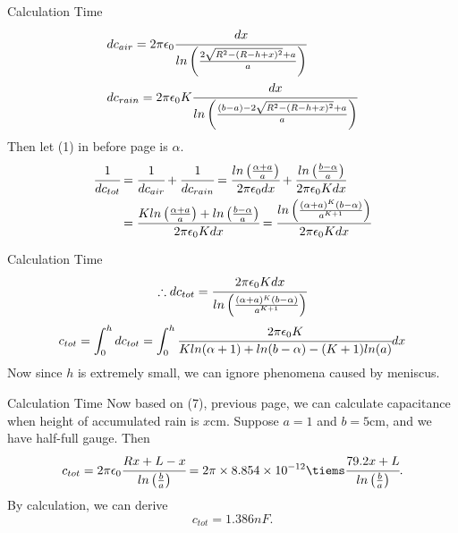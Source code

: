 \documentclass{beamer}
\begin{document}
\begin{frame}{Calculation Time}
    \begin{align}
        &dc_{air}=2\pi\epsilon_0\cfrac{dx}{ln\left(\frac{2\sqrt{R^2-(R-h+x)^2}+a}{a}\right)} \\
        &dc_{rain}=2\pi\epsilon_0K\cfrac{dx}{ln\left(\frac{(b-a)-2\sqrt{R^2-(R-h+x)^2}+a}{a}\right)}
    \end{align} 
    Then let (1) in before page is $\alpha$.
    \begin{align}
        \cfrac{1}{dc_{tot}}&=\cfrac{1}{dc_{air}}+\cfrac{1}{dc_{rain}}=\cfrac{ln\left(\frac{\alpha+a}{a}\right)}{2\pi\epsilon_0dx}+\cfrac{ln\left(\frac{b-\alpha}{a}\right)}{2\pi\epsilon_0Kdx} \\
        \nonumber &=\cfrac{Kln\left(\frac{\alpha+a}{a}\right)+ln\left(\frac{b-\alpha}{a}\right)}{2\pi\epsilon_0Kdx}=\cfrac{ln\left(\frac{(\alpha+a)^K(b-\alpha)}{a^{K+1}}\right)}{2\pi\epsilon_0Kdx}
    \end{align}
\end{frame}

\begin{frame}{Calculation Time}
    \begin{equation}
        \therefore dc_{tot}=\cfrac{2\pi\epsilon_0Kdx}{ln\left(\frac{(\alpha+a)^K(b-\alpha)}{a^{K+1}}\right)}
    \end{equation}
    \begin{align}
        c_{tot}=\int_0^hdc_{tot}=\int_0^h\cfrac{2\pi\epsilon_0K}{Kln(\alpha+1)+ln(b-\alpha)-(K+1)ln(a)}dx
    \end{align}
    Now since $h$ is extremely small, we can ignore phenomena caused by meniscus.
\end{frame}

\begin{frame}{Calculation Time}
    Now based on (7), previous page, we can calculate capacitance when height of accumulated rain is $x$cm. Suppose $a=1$ and $b=5$cm, and we have half-full gauge. Then
    \begin{equation}
        \nonumber c_{tot}=2\pi\epsilon_0\cfrac{Rx+L-x}{ln\left(\frac{b}{a}\right)}=2\pi\times8.854\times10^{-12}\tiems\cfrac{79.2x+L}{ln\left(\frac{b}{a}\right)}.
    \end{equation}
    By calculation, we can derive 
    \begin{equation}
        \nonumber c_{tot}=1.386nF.
    \end{equation}
\end{frame}
\end{document}

